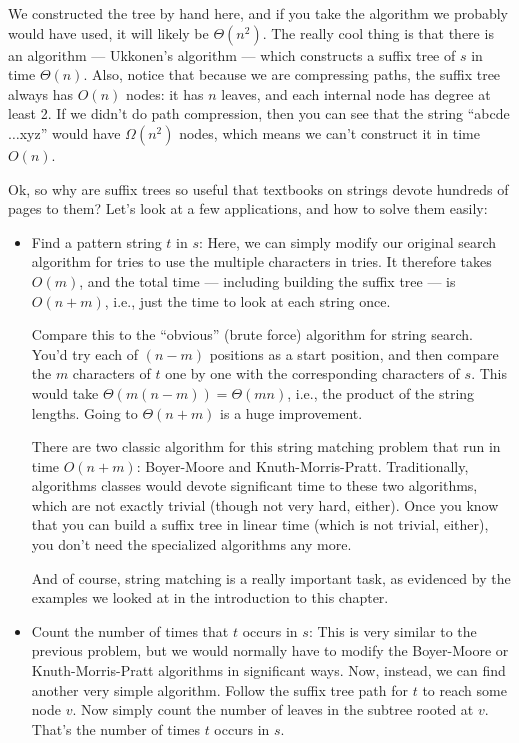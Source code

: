 We constructed the tree by hand here, and if you take the algorithm we
probably would have used, it will likely be $\Theta(n^2)$.
The really cool thing is that there is an algorithm --- Ukkonen's
algorithm --- which constructs a suffix tree of $s$ in time
$\Theta(n)$.
Also, notice that because we are compressing paths, the suffix tree
always has $O(n)$ nodes: it has $n$ leaves, and each internal node has
degree at least 2. If we didn't do path compression, then you can see
that the string ``abcde$\ldots$xyz'' would have $\Omega(n^2)$ nodes,
which means we can't construct it in time $O(n)$.

Ok, so why are suffix trees so useful that textbooks on strings devote
hundreds of pages to them? Let's look at a few applications, and how
to solve them easily:

\begin{itemize}
\item Find a pattern string $t$ in $s$: Here, we can simply modify our
  original search algorithm for tries to use the multiple characters
  in tries. It therefore takes $O(m)$, and the total time ---
  including building the suffix tree --- is $O(n+m)$, i.e., just the
  time to look at each string once.

  Compare this to the ``obvious'' (brute force) algorithm for string
  search. You'd try each of $(n-m)$ positions as a start position, and
  then compare the $m$ characters of $t$ one by one with the
  corresponding characters of $s$. This would take $\Theta(m (n-m)) =
  \Theta(mn)$, i.e., the product of the string lengths.
  Going to $\Theta(n+m)$ is a huge improvement.

  There are two classic algorithm for this string matching problem
  that run in time $O(n+m)$: Boyer-Moore and Knuth-Morris-Pratt. 
  Traditionally, algorithms classes would devote significant time to
  these two algorithms, which are not exactly trivial (though not very
  hard, either). Once you know that you can build a suffix tree in
  linear time (which is not trivial, either), you don't need the
  specialized algorithms any more.

  And of course, string matching is a really important task, as
  evidenced by the examples we looked at in the introduction to this
  chapter. 

\item Count the number of times that $t$ occurs in $s$: This is very
  similar to the previous problem, but we would normally have to
  modify the Boyer-Moore or Knuth-Morris-Pratt algorithms in
  significant ways. Now, instead, we can find another very simple
  algorithm. Follow the suffix tree path for $t$ to reach some node
  $v$. Now simply count the number of leaves in the subtree rooted at
  $v$. That's the number of times $t$ occurs in $s$.


\end{itemize}
